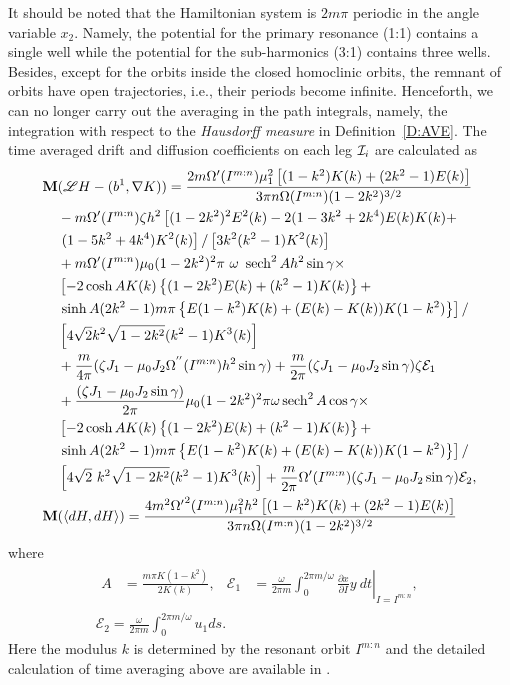It should be noted that the Hamiltonian system is $2m\pi$ periodic in the angle variable $x_2$. Namely, the potential for the primary resonance (1:1) contains a single well while the potential for the sub-harmonics (3:1) contains three wells. Besides, except for the orbits inside the closed homoclinic orbits, the remnant of orbits have open trajectories, i.e., their periods become infinite. Henceforth, we can no longer carry out the averaging in the path integrals, namely, the integration with respect to the \emph{Hausdorff measure} in Definition~\ref{D:AVE}. The time averaged drift and diffusion coefficients on each leg $\mathcal I_i$ are calculated as
\begin{align*}
\operatorname{\mathbf M} & (\mathscr L H -(b^1, \nabla K)) =\frac{2m \Omega^\prime (I^{m:n}) \mu_1^2 \left[(1 - k^2) K(k) + (2k^2-1)E(k)\right]}{3\pi n \Omega(I^{m:n}) (1-2k^2)^{3/2}}\\
& - m \Omega^\prime(I^{m:n}) \zeta h^2 \left[(1 - 2k^2)^2 E^2(k)-2(1-3k^2+2k^4)E(k)K(k)+ \right.\\
& \left.(1-5k^2+4k^4)K^2(k) \right]/ \left[3k^2(k^2-1)K^2(k)\right]\\
& + m \Omega^\prime(I^{m:n}) \mu_0 (1 - 2k^2)^2 \pi\ \omega\ \operatorname{sech}^2 A h^2 \sin \gamma \times\\
& \left[-2\cosh A K(k) \left\{(1-2k^2)E(k)+(k^2-1)K(k)\right\} + \right.\\
& \left. \sinh A (2k^2-1)m \pi \left\{ E(1 - k^2)K(k)+(E(k)-K(k))K(1 - k^2)\right\} \right]/\\
& \left[4 \sqrt{2} k^2 \sqrt{1 - 2k^2}(k^2 - 1)K^3(k)\right]\\
& + \frac{m}{4 \pi} (\zeta J_1 -\mu_0 J_2 \Omega^{''}(I^{m:n}) h^2 \sin \gamma)
+ \frac{m}{2 \pi} (\zeta J_1 -\mu_0 J_2 \sin\gamma) \zeta{\mathcal E}_1\\
& +\frac{ (\zeta J_1 -\mu_0 J_2 \sin \gamma)}{2 \pi} \mu_0 (1 - 2k^2)^2 \pi \omega \operatorname{sech}^2 A \cos \gamma \times\\
& \left[- 2\cosh A K(k) \left\{(1-2k^2)E(k)+(k^2-1)K(k)\right\} + \right.\\
& \left. \sinh A (2k^2-1) m \pi \left\{ E(1 - k^2) K(k) + (E(k) - K(k)) K(1 - k^2)\right\} \right]/\\
&\left[ 4\sqrt{2} \ k^2\sqrt{1-2k^2}(k^2-1)K^3(k)\right]
+ \frac{m}{2\pi} \Omega'(I^{m:n})(\zeta J_1-\mu_0 J_2 \sin \gamma) \mathcal E_2,\\
\operatorname{\mathbf M} &(\langle dH, dH \rangle) = \frac{4 m^2 {\Omega'} ^2(I^{m:n}) 
\mu_1^2 h^2 \left[(1-k^2) K(k)+(2k^2-1)E(k)\right]}{3\pi
n\Omega(I^{m:n}) (1-2k^2)^{3/2}}
\end{align*}
where
\begin{gather*}
\begin{aligned}
A &= \frac{m \pi K(1 - k^2)}{2K(k)}, & \mathcal E_1 &= \frac{\omega}{2\pi m}\left.\int_0^{2\pi m/\omega} \frac{\partial x}{\partial I} y \ dt \right|_{I=I^{m:n}},
\end{aligned}\\
{\mathcal E}_2 = \frac{\omega}{2\pi m} \int_0^{2\pi m/\omega}
u_1 ds.
\end{gather*}
Here the modulus $k$ is determined by the resonant orbit $I^{m:n}$ and the detailed calculation of time averaging above are available in \citet[Appendix F]{choi03:_dynam}.

